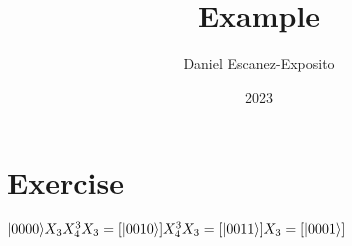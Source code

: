 \documentclass{article}
\title{Example}
\author{Daniel Escanez-Exposito}
\date{2023}
\begin{document}
    \maketitle

    \section{Exercise}
    $
     |0000\rangle X_{3}X_{4}^{3}X_{3}\\ \\ 
= [ |0010\rangle ]X_{4}^{3}X_{3}\\ \\ 
= [ |0011\rangle ]X_{3}\\ \\ 
= [ |0001\rangle ]\\ 
    $
    
\end{document}
